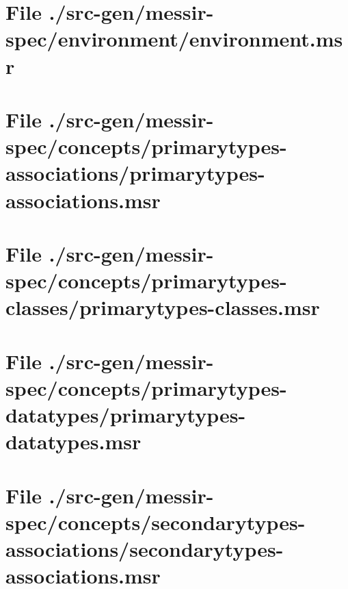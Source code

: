 \section[File /src-gen/messir-spec/environment/environment.msr]{File ./src-gen/messir-spec/environment/environment.msr}
\scriptsize

\normalsize
	
\section[File /src-gen/messir-spec/concepts.../primarytypes-associations.msr]{File ./src-gen/messir-spec/concepts/primarytypes-associations/primarytypes-associations.msr}
\scriptsize

\normalsize
	
\section[File /src-gen/messir-spec/concepts/primarytypes-classes/primarytypes-classes.msr]{File ./src-gen/messir-spec/concepts/primarytypes-classes/primarytypes-classes.msr}
\scriptsize

\normalsize
	
\section[File /src-gen/messir-spec/concepts.../primarytypes-datatypes.msr]{File ./src-gen/messir-spec/concepts/primarytypes-datatypes/primarytypes-datatypes.msr}
\scriptsize

\normalsize
	
\section[File /src-gen/messir-spec/concepts.../secondarytypes-associations.msr]{File ./src-gen/messir-spec/concepts/secondarytypes-associations/secondarytypes-associations.msr}
\scriptsize

\normalsize
	
